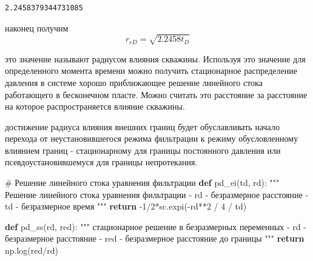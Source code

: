 \documentclass[
  russian,
  letterpaper,
  DIV=11,
  numbers=noendperiod,
  oneside]{scrartcl}
\newenvironment{Shaded}{\begin{snugshade}}{\end{snugshade}}
\newcommand{\CommentTok}[1]{\textcolor[rgb]{0.37,0.37,0.37}{#1}}
\newcommand{\ControlFlowTok}[1]{\textcolor[rgb]{0.00,0.23,0.31}{\textbf{#1}}}
\newcommand{\DecValTok}[1]{\textcolor[rgb]{0.68,0.00,0.00}{#1}}
\newcommand{\KeywordTok}[1]{\textcolor[rgb]{0.00,0.23,0.31}{\textbf{#1}}}
\newcommand{\NormalTok}[1]{\textcolor[rgb]{0.00,0.23,0.31}{#1}}
\newcommand{\OperatorTok}[1]{\textcolor[rgb]{0.37,0.37,0.37}{#1}}
\begin{document}
\begin{verbatim}
2.2458379344731085
\end{verbatim}

наконец получим \[
r_{eD} = \sqrt {2.2458 t_D}
\]

это значение называют радиусом влияния скважины. Используя это значение
для определенного момента времени можно получить стационарное
распределение давления в системе хорошо приближающее решение линейного
стока работающего в бесконечном пласте. Можно считать это расстояние за
расстояние на которое распространяется влияние скважины.

достижение радиуса влияния внешних границ будет обуславливать начало
перехода от неустановившегося режима фильтрации к режиму обусловленному
влиянием границ - стационарному для границы постоянного давления или
псевдоустановившемуся для границы непротекания.

\begin{Shaded}
\begin{Highlighting}[]
\CommentTok{\# Решение линейного стока уравнения фильтрации}
\KeywordTok{def}\NormalTok{ pd\_ei(td, rd):}
    \CommentTok{"""}
\CommentTok{    Решение линейного стока уравнения фильтрации}
\CommentTok{    {-} rd {-} безразмерное расстояние}
\CommentTok{    {-} td {-} безразмерное время}
\CommentTok{    """}
    \ControlFlowTok{return} \OperatorTok{{-}}\DecValTok{1}\OperatorTok{/}\DecValTok{2}\OperatorTok{*}\NormalTok{sc.expi(}\OperatorTok{{-}}\NormalTok{rd}\OperatorTok{**}\DecValTok{2} \OperatorTok{/} \DecValTok{4} \OperatorTok{/}\NormalTok{ td)}


\KeywordTok{def}\NormalTok{ pd\_ss(rd, red):}
    \CommentTok{"""}
\CommentTok{    стационарное решение в безразмерных переменных}
\CommentTok{    {-} rd {-} безразмерное расстояние}
\CommentTok{    {-} red {-} безразмерное расстояние до границы}
\CommentTok{    """}
    \ControlFlowTok{return}\NormalTok{ np.log(red}\OperatorTok{/}\NormalTok{rd)}
\end{Highlighting}
\end{Shaded}
\end{document}
